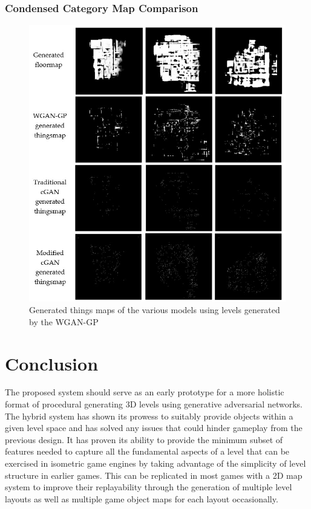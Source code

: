 \documentclass{Configuration_Files/PoliMi3i_thesis}
\begin{document}
\subsection{Condensed Category Map Comparison}
\begin{figure}[H]
    \centering
    \includegraphics[width=1\textwidth]{sample_comparison.jpg}
    \caption[Generated things maps comparision]{ Generated things maps of the various models using levels generated by 
the WGAN-GP}
    \label{fig:samplecomparison}
\end{figure}

\chapter{Conclusion}
\label{ch:conclusion}%
The proposed system should serve as an early prototype for a more holistic format 
of procedural generating 3D levels using generative adversarial networks. The 
hybrid system has shown its prowess to suitably provide objects within a given level 
space and has solved any issues that could hinder gameplay from the previous 
design. It has proven its ability to provide the minimum subset of features needed 
to capture all the fundamental aspects of a level that can be exercised in isometric 
game engines by taking advantage of the simplicity of level structure in earlier 
games. This can be replicated in most games with a 2D map system to improve their 
replayability through the generation of multiple level layouts as well as multiple 
game object maps for each layout occasionally.
\end{document}
